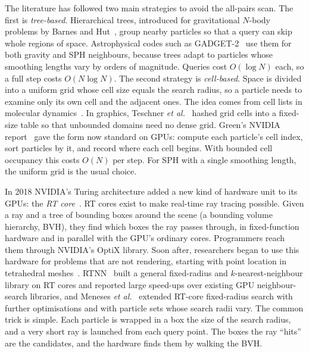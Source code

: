 \documentclass[conference]{IEEEtran}
\begin{document}
The literature has followed two main strategies to avoid the all-pairs scan. The first is \emph{tree-based}. Hierarchical trees, introduced for gravitational $N$-body problems by Barnes and Hut~\cite{barnes1986}, group nearby particles so that a query can skip whole regions of space. Astrophysical codes such as GADGET-2~\cite{springel2005} use them for both gravity and SPH neighbours, because trees adapt to particles whose smoothing lengths vary by orders of magnitude. Queries cost $O(\log N)$ each, so a full step costs $O(N\log N)$. The second strategy is \emph{cell-based}. Space is divided into a uniform grid whose cell size equals the search radius, so a particle needs to examine only its own cell and the adjacent ones. The idea comes from cell lists in molecular dynamics~\cite{hockney1988}. In graphics, Teschner \emph{et al.}~\cite{teschner2003optimized} hashed grid cells into a fixed-size table so that unbounded domains need no dense grid. Green's NVIDIA report~\cite{green2010cuda} gave the form now standard on GPUs: compute each particle's cell index, sort particles by it, and record where each cell begins. With bounded cell occupancy this costs $O(N)$ per step. For SPH with a single smoothing length, the uniform grid is the usual choice.

In 2018 NVIDIA's Turing architecture added a new kind of hardware unit to its GPUs: the \emph{RT core}~\cite{nvidia2018turing}. RT cores exist to make real-time ray tracing possible. Given a ray and a tree of bounding boxes around the scene (a bounding volume hierarchy, BVH), they find which boxes the ray passes through, in fixed-function hardware and in parallel with the GPU's ordinary cores. Programmers reach them through NVIDIA's OptiX library. Soon after, researchers began to use this hardware for problems that are not rendering, starting with point location in tetrahedral meshes~\cite{wald2019rtx}. RTNN~\cite{zhu2022rtnn} built a general fixed-radius and $k$-nearest-neighbour library on RT cores and reported large speed-ups over existing GPU neighbour-search libraries, and Meneses \emph{et al.}~\cite{meneses2026rtnn} extended RT-core fixed-radius search with further optimisations and with particle sets whose search radii vary. The common trick is simple. Each particle is wrapped in a box the size of the search radius, and a very short ray is launched from each query point. The boxes the ray ``hits'' are the candidates, and the hardware finds them by walking the BVH.
\end{document}
